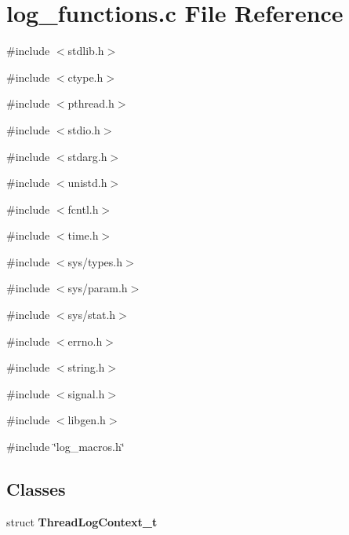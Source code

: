 \section{log\_\-functions.c File Reference}
\label{log__functions_8c}
{\ttfamily \#include $<$stdlib.h$>$}\par
{\ttfamily \#include $<$ctype.h$>$}\par
{\ttfamily \#include $<$pthread.h$>$}\par
{\ttfamily \#include $<$stdio.h$>$}\par
{\ttfamily \#include $<$stdarg.h$>$}\par
{\ttfamily \#include $<$unistd.h$>$}\par
{\ttfamily \#include $<$fcntl.h$>$}\par
{\ttfamily \#include $<$time.h$>$}\par
{\ttfamily \#include $<$sys/types.h$>$}\par
{\ttfamily \#include $<$sys/param.h$>$}\par
{\ttfamily \#include $<$sys/stat.h$>$}\par
{\ttfamily \#include $<$errno.h$>$}\par
{\ttfamily \#include $<$string.h$>$}\par
{\ttfamily \#include $<$signal.h$>$}\par
{\ttfamily \#include $<$libgen.h$>$}\par
{\ttfamily \#include \char`\"{}log\_\-macros.h\char`\"{}}\par
\subsection*{Classes}
\begin{DoxyCompactItemize}
\item 
struct {\bf ThreadLogContext\_\-t}
\end{DoxyCompactItemize}
